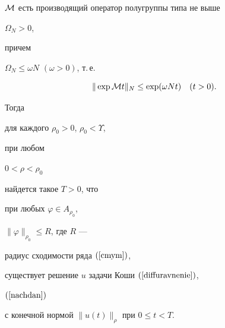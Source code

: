 \begin{thm}
${\cal{M}}$ есть производящий оператор полугруппы типа не выше


$\Omega_N>0$,


причем


$\Omega_N\leq \omega N$ $(\omega>0)$, т.\,е.


\begin{equation}


\label{tip}


\|\exp{\cal{M}}t \|_N\leq \exp(\omega N t) \quad (t>0).


\end{equation}


Тогда


для каждого $\rho_0>0$, $\rho_0<\Upsilon$,


при любом


$0<\rho<\rho_0$


найдется такое $T>0$, что


при любых $\varphi\in A_{\rho_0}$,


$\|\varphi\|_{\rho_0}\leq R$, где $R$ ---


радиус сходимости ряда $(\ref{cmym})$,


существует решение $u$ задачи Коши $(\ref{diffuravnenie})$,


$(\ref{nachdan})$


с конечной нормой $\|u(t)\|_\rho$ при $0\leq t<T$.


\end{thm}





